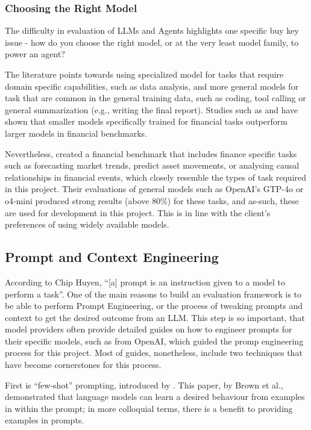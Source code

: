 \documentclass[a4paper]{report}
\begin{document}
\subsubsection{Choosing the Right Model}

The difficulty in evaluation of LLMs and Agents highlights one specific buy key issue - how do you choose the right model, or at the very least model family, to power an agent?

The literature points towards using specialized model for tasks that require domain specific capabilities, such as data analysis, and more general models for task that are common in the general training data, such as coding, tool calling or general summarization (e.g., writing the final report). Studies such as \cite{ke2025demystifyingdomainadaptiveposttrainingfinancial} and \cite{tanabe2024enhancingfinancialdomainadaptation} have shown that smaller models specifically trained for financial tasks outperform larger models in financial benchmarks.

Nevertheless, \cite{lu2025bizfinbench} created a financial benchmark that includes finance specific tasks such as forecasting market trends, predict asset movements, or analysing causal relationships in financial events, which closely resemble the types of task required in this project. Their evaluations of general models such as OpenAI's GTP-4o or o4-mini produced strong results (above 80\%) for these tasks, and as-such, these are used for development in this project. This is in line with the client's preferences of using widely available models.

\subsection{Prompt and Context Engineering}

According to Chip Huyen, ``[a] prompt is an instruction given to a model to perform a task''. One of the main reasons to build an evaluation framework is to be able to perform Prompt Engineering, or the process of tweaking prompts and context to get the desired outcome from an LLM. This step is so important, that model providers often provide detailed guides on how to engineer prompts for their specific models, such as \cite{openai2025promptengineering} from OpenAI, which guided the promp engineering process for this project. Most of guides, nonetheless, include two techniques that have become cornerstones for this process.

First is ``few-shot'' prompting, introduced by \cite{brown2020languagemodelsfewshotlearners}. This paper, by Brown et al., demonstrated that language models can learn a desired behaviour from examples in within the prompt; in more colloquial terms, there is a benefit to providing examples in prompts.
\end{document}
